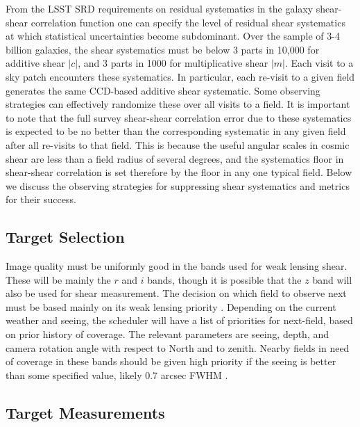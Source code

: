 From the LSST SRD requirements on residual systematics in the galaxy shear-shear
correlation function one can specify the level of residual shear systematics at
which statistical uncertainties become subdominant.  Over the sample of 3-4
billion galaxies, the shear systematics must be below 3 parts in 10,000 for
additive shear $|c|$, and 3 parts in 1000 for multiplicative shear $|m|$.  Each
visit to a sky patch encounters these systematics.  In particular, each re-visit
to a given field generates the same CCD-based additive shear systematic.  Some
observing strategies can effectively randomize these over all visits to a field.
It is important to note that the full survey shear-shear correlation error due
to these systematics is expected to be no better than the corresponding
systematic in any given field after all re-visits to that field. This is because
the useful angular scales in cosmic shear are less than a field radius of
several degrees, and the systematics floor in shear-shear correlation is set
therefore by the floor in any one typical field.  Below we discuss the observing
strategies for suppressing shear systematics and metrics for their success.


\subsection{Target Selection}

Image quality must be uniformly good in the bands used for weak lensing shear.
These will be mainly the $r$ and $i$ bands, though it is possible that the $z$
band will also be used for shear measurement.  The decision on which field to
observe next must be based mainly on its weak lensing priority \citep[Sec 3.1
and Figure 14.4]{2009arXiv0912.0201L}.  Depending on the current weather and
seeing, the scheduler will have a list of priorities for next-field, based on
prior history of coverage.  The relevant parameters are seeing, depth, and
camera rotation angle with respect to North and to zenith. Nearby fields in need
of coverage in these bands should be given high priority if the seeing is better
than some specified value, likely 0.7 arcsec FWHM \citep[Sec
14.5.2]{2009arXiv0912.0201L}.

\subsection{Target Measurements}

